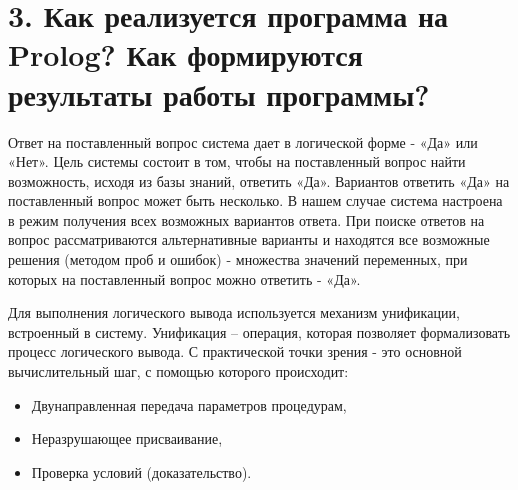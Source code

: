 \documentclass[12pt]{report}
\begin{document}
\section*{3. Как реализуется программа на Prolog? Как формируются результаты работы программы?}

Ответ на поставленный вопрос система дает в логической форме - «Да» или «Нет». Цель системы состоит в том, чтобы на поставленный вопрос найти возможность, исходя из базы знаний, ответить «Да». Вариантов ответить «Да» на поставленный вопрос может быть несколько. В нашем случае система настроена в режим получения всех возможных вариантов ответа. При поиске ответов на вопрос рассматриваются альтернативные варианты и находятся все возможные решения (методом проб и ошибок) - множества значений переменных, при которых на поставленный вопрос можно ответить - «Да».

Для выполнения логического вывода используется механизм унификации, встроенный в систему.
Унификация – операция, которая позволяет формализовать процесс логического вывода. С практической точки зрения  - это основной вычислительный шаг, с помощью которого происходит:
\begin{itemize}
	\item Двунаправленная передача параметров процедурам,
	\item Неразрушающее присваивание,
	\item Проверка условий (доказательство).
\end{itemize}
\end{document}
